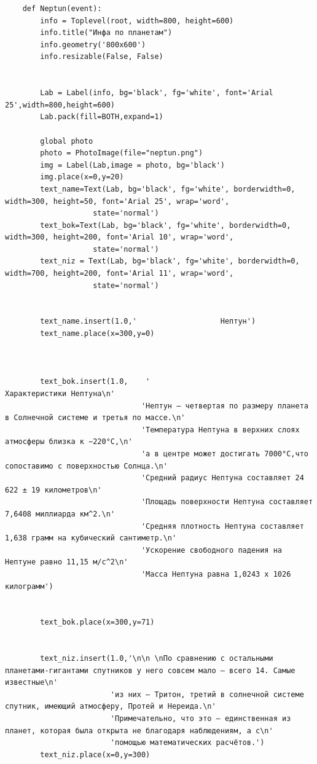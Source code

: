 \documentclass[11pt,a4paper]{report}
\begin{document}
\begin{verbatim}
    def Neptun(event):  
        info = Toplevel(root, width=800, height=600)
        info.title("Инфа по планетам")
        info.geometry('800x600')
        info.resizable(False, False) 
        
        
        Lab = Label(info, bg='black', fg='white', font='Arial 25',width=800,height=600)  
        Lab.pack(fill=BOTH,expand=1)
        
        global photo
        photo = PhotoImage(file="neptun.png")
        img = Label(Lab,image = photo, bg='black')
        img.place(x=0,y=20)
        text_name=Text(Lab, bg='black', fg='white', borderwidth=0, width=300, height=50, font='Arial 25', wrap='word',
                    state='normal')  
        text_bok=Text(Lab, bg='black', fg='white', borderwidth=0, width=300, height=200, font='Arial 10', wrap='word',
                    state='normal')  
        text_niz = Text(Lab, bg='black', fg='white', borderwidth=0, width=700, height=200, font='Arial 11', wrap='word',
                    state='normal')  
    
       
        text_name.insert(1.0,'                   Нептун')
        text_name.place(x=300,y=0)
        
        
        
        text_bok.insert(1.0,    '                                           Характеристики Нептуна\n' 
                               'Нептун – четвертая по размеру планета в Солнечной системе и третья по массе.\n'
                               'Температура Нептуна в верхних слоях атмосферы близка к −220°C,\n'
                               'а в центре может достигать 7000°C,что сопоставимо с поверхностью Солнца.\n'
                               'Средний радиус Нептуна составляет 24 622 ± 19 километров\n'
                               'Площадь поверхности Нептуна составляет 7,6408 миллиарда км^2.\n'
                               'Средняя плотность Нептуна составляет 1,638 грамм на кубический сантиметр.\n'
                               'Ускорение свободного падения на Нептуне равно 11,15 м/c^2\n'
                               'Масса Нептуна равна 1,0243 х 1026 килограмм')
        
        
        text_bok.place(x=300,y=71)        
        
        
        text_niz.insert(1.0,'\n\n \nПо сравнению с остальными планетами-гигантами спутников у него совсем мало – всего 14. Самые известные\n'
                        'из них – Тритон, третий в солнечной системе спутник, имеющий атмосферу, Протей и Нереида.\n'
                        'Примечательно, что это – единственная из планет, которая была открыта не благодаря наблюдениям, а с\n'
                        'помощью математических расчётов.')
        text_niz.place(x=0,y=300)
    

\end{verbatim}
\end{document}
